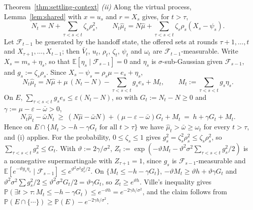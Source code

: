 \documentclass[anon]{alt2027} %
\newcommand{\Prb}{\mathbb{P}}
\newcommand{\E}{\mathbb{E}}
\begin{document}
\begin{proofof}{Theorem~\ref{thm:settling-context}}
\emph{(ii)} Along the virtual process, Lemma~\ref{lem:shared} with
$x=u_s$ and $r=X_s$ gives, for $t>\tau$,
\[
N_t=N+\sum_{\tau<s<t}\zeta_s\rho_s^2,\qquad
N_t\widehat\mu_t=N\widehat\mu+\sum_{\tau<s<t}\zeta_s\rho_s(X_s-\psi_s).
\]
Let $\mathcal F_{t-1}$ be generated by the handoff state, the offered sets
at rounds $\tau+1,\dots,t$ and $X_{\tau+1},\dots,X_{t-1}$; then $\bar V_t$,
$u_t$, $\rho_t$, $\zeta_t$, $\psi_t$ and $\omega_t$ are
$\mathcal F_{t-1}$-measurable. Write $X_s=m_s+\eta_s$, so that
$\E[\eta_s\mid\mathcal F_{s-1}]=0$ and $\eta_s$ is $\sigma$-sub-Gaussian
given $\mathcal F_{s-1}$, and $g_s:=\zeta_s\rho_s$. Since
$X_s-\psi_s=\rho_s\mu-e_s+\eta_s$,
\[
N_t\widehat\mu_t=N\widehat\mu+\mu\,(N_t-N)-\sum_{\tau<s<t}g_se_s+M_t,
\qquad M_t:=\sum_{\tau<s<t}g_s\eta_s .
\]
On $E$, $\sum_{\tau<s<t}g_se_s\le\varepsilon(N_t-N)$, so with
$G_t:=N_t-N\ge0$ and $\gamma:=\mu-\varepsilon-\bar\omega>0$,
\[
N_t\widehat\mu_t-\bar\omega N_t\ \ge\ (N\widehat\mu-\bar\omega N)+(\mu-\varepsilon-\bar\omega)G_t+M_t
\ =\ h+\gamma G_t+M_t .
\]
Hence on $E\cap\{M_t>-h-\gamma G_t\text{ for all }t>\tau\}$ we have
$\widehat\mu_t>\bar\omega\ge\omega_t$ for every $t>\tau$, and (i) applies.
For the probability, $0\le\zeta_s\le1$ gives $g_s^2=\zeta_s^2\rho_s^2\le\zeta_s\rho_s^2$,
so $\sum_{\tau<s<t}g_s^2\le G_t$. With $\vartheta:=2\gamma/\sigma^2$,
$Z_t:=\exp(-\vartheta M_t-\vartheta^2\sigma^2\sum_{\tau<s<t}g_s^2/2)$ is a
nonnegative supermartingale with $Z_{\tau+1}=1$, since $g_s$ is
$\mathcal F_{s-1}$-measurable and
$\E[e^{-\vartheta g_s\eta_s}\mid\mathcal F_{s-1}]\le e^{\vartheta^2\sigma^2g_s^2/2}$.
On $\{M_t\le-h-\gamma G_t\}$,
$-\vartheta M_t\ge\vartheta h+\vartheta\gamma G_t$ and
$\vartheta^2\sigma^2\sum g_s^2/2\le\vartheta^2\sigma^2G_t/2=\vartheta\gamma G_t$,
so $Z_t\ge e^{\vartheta h}$. Ville's inequality gives
$\Prb(\exists t>\tau:M_t\le-h-\gamma G_t)\le e^{-\vartheta h}=e^{-2\gamma h/\sigma^2}$,
and the claim follows from $\Prb(E\cap\{\cdots\})\ge\Prb(E)-e^{-2\gamma h/\sigma^2}$.
\end{proofof}
\end{document}
